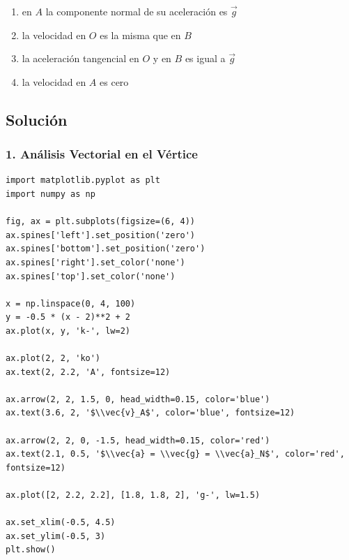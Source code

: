 \documentclass[12pt, a4paper]{article}
\begin{document}
\begin{center}
\end{center}

\begin{enumerate}[label=\alph*)]
    \item en $A$ la componente normal de su aceleración es $\vec{g}$
    \item la velocidad en $O$ es la misma que en $B$
    \item la aceleración tangencial en $O$ y en $B$ es igual a $\vec{g}$
    \item la velocidad en $A$ es cero
\end{enumerate}

\subsection*{Solución}

\subsubsection*{1. Análisis Vectorial en el Vértice}

\begin{verbatim}
import matplotlib.pyplot as plt
import numpy as np

fig, ax = plt.subplots(figsize=(6, 4))
ax.spines['left'].set_position('zero')
ax.spines['bottom'].set_position('zero')
ax.spines['right'].set_color('none')
ax.spines['top'].set_color('none')

x = np.linspace(0, 4, 100)
y = -0.5 * (x - 2)**2 + 2
ax.plot(x, y, 'k-', lw=2)

ax.plot(2, 2, 'ko')
ax.text(2, 2.2, 'A', fontsize=12)

ax.arrow(2, 2, 1.5, 0, head_width=0.15, color='blue')
ax.text(3.6, 2, '$\\vec{v}_A$', color='blue', fontsize=12)

ax.arrow(2, 2, 0, -1.5, head_width=0.15, color='red')
ax.text(2.1, 0.5, '$\\vec{a} = \\vec{g} = \\vec{a}_N$', color='red', fontsize=12)

ax.plot([2, 2.2, 2.2], [1.8, 1.8, 2], 'g-', lw=1.5)

ax.set_xlim(-0.5, 4.5)
ax.set_ylim(-0.5, 3)
plt.show()
\end{verbatim}
\end{document}
